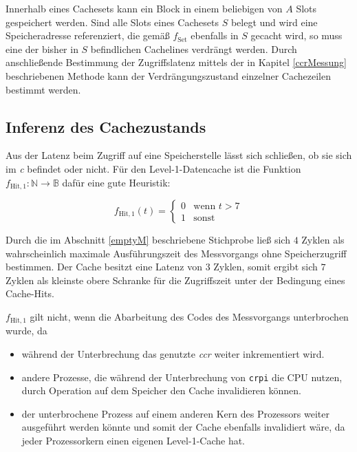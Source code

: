 \documentclass[]{scrbook}
\begin{document}
Innerhalb eines Cachesets kann ein Block in einem beliebigen von $A$ Slots gespeichert werden.
Sind alle Slots eines Cachesets $S$ belegt und wird eine Speicheradresse referenziert, die gemäß $f_{\textrm{Set}}$ ebenfalls in $S$ gecacht wird, so muss eine der bisher in $S$ befindlichen Cachelines verdrängt werden.
Durch anschließende Bestimmung der Zugriffslatenz mittels der in Kapitel \ref{ccrMessung} beschriebenen Methode kann der Verdrängungszustand einzelner Cachezeilen bestimmt werden.

\subsection{Inferenz des Cachezustands}

Aus der Latenz beim Zugriff auf eine Speicherstelle lässt sich schließen, ob sie sich im \textsl{\gls{c}} befindet oder nicht.
Für den Level-1-Datencache ist die Funktion $f_{\textrm{Hit}, 1}: \mathbb{N} \rightarrow \mathbb{B}$ dafür eine gute Heuristik:

\begin{equation}
	f_{\textrm{Hit}, 1} (t) =
	\begin{cases}
        0 & \textrm{wenn } t > 7\\
        1 & \textrm{sonst}
	\end{cases} 
\end{equation}

Durch die im Abschnitt \ref{emptyM} beschriebene Stichprobe ließ sich $4$ Zyklen als wahrscheinlich maximale Ausführungszeit des Messvorgangs ohne Speicherzugriff bestimmen.
Der Cache besitzt eine Latenz von $3$ Zyklen, somit ergibt sich $7$ Zyklen als kleinste obere Schranke für die Zugriffszeit unter der Bedingung eines Cache-Hits. \cite[S.\,18]{a53trm}

$f_{\textrm{Hit}, 1}$ gilt nicht, wenn die Abarbeitung des Codes des Messvorgangs unterbrochen wurde, da

\begin{itemize}
	\item während der Unterbrechung das genutzte \textsl{\gls{ccr}} weiter inkrementiert wird.
	\item andere Prozesse, die während der Unterbrechung von \texttt{crpi} die CPU nutzen, durch Operation auf dem Speicher den Cache invalidieren können.
	\item der unterbrochene Prozess auf einem anderen Kern des Prozessors weiter ausgeführt werden könnte und somit der Cache ebenfalls invalidiert wäre, da jeder Prozessorkern einen eigenen Level-1-Cache hat.
\end{itemize}
\end{document}

